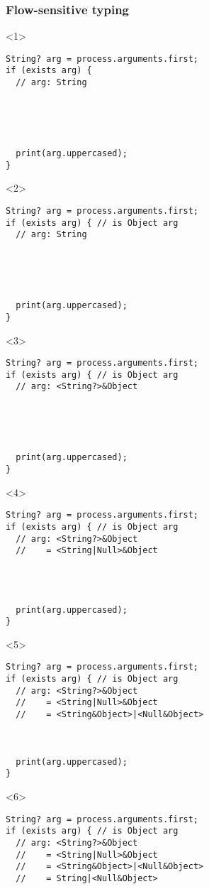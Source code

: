 \documentclass[aspectratio=169]{beamer}
\begin{document}
\begin{frame}[fragile]
  \frametitle{Flow-sensitive typing}
  \begin{onlyenv}<1>
    \begin{lstlisting}
String? arg = process.arguments.first;
if (exists arg) {
  // arg: String





  print(arg.uppercased);
}
    \end{lstlisting}
  \end{onlyenv}
  \begin{onlyenv}<2>
    \begin{lstlisting}
String? arg = process.arguments.first;
if (exists arg) { // is Object arg
  // arg: String





  print(arg.uppercased);
}
    \end{lstlisting}
  \end{onlyenv}
  \begin{onlyenv}<3>
    \begin{lstlisting}
String? arg = process.arguments.first;
if (exists arg) { // is Object arg
  // arg: <String?>&Object





  print(arg.uppercased);
}
    \end{lstlisting}
  \end{onlyenv}
  \begin{onlyenv}<4>
    \begin{lstlisting}
String? arg = process.arguments.first;
if (exists arg) { // is Object arg
  // arg: <String?>&Object
  //    = <String|Null>&Object




  print(arg.uppercased);
}
    \end{lstlisting}
  \end{onlyenv}
  \begin{onlyenv}<5>
    \begin{lstlisting}
String? arg = process.arguments.first;
if (exists arg) { // is Object arg
  // arg: <String?>&Object
  //    = <String|Null>&Object
  //    = <String&Object>|<Null&Object>



  print(arg.uppercased);
}
    \end{lstlisting}
  \end{onlyenv}
  \begin{onlyenv}<6>
    \begin{lstlisting}
String? arg = process.arguments.first;
if (exists arg) { // is Object arg
  // arg: <String?>&Object
  //    = <String|Null>&Object
  //    = <String&Object>|<Null&Object>
  //    = String|<Null&Object>



\end{lstlisting}
\end{onlyenv}
\end{frame}
\end{document}
